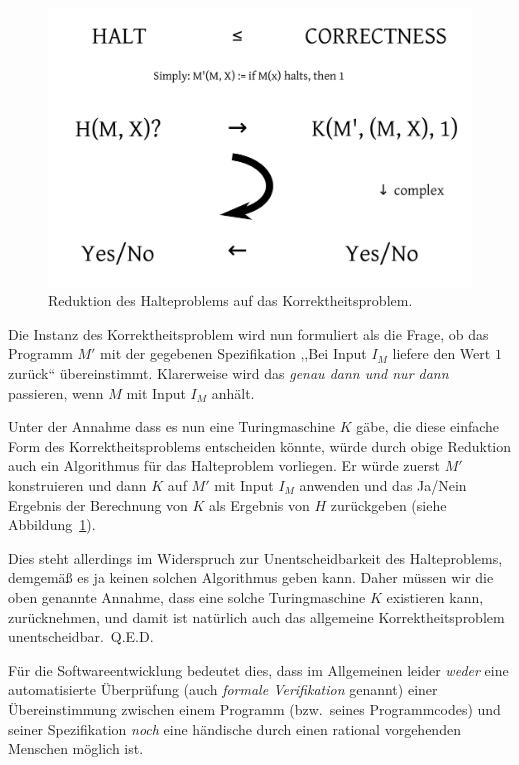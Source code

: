 \begin{figure}[h]
 \begin{center}
  \includegraphics[width=12cm]{img/correctnessproblem}
  \caption{Reduktion des Halteproblems auf das Korrektheitsproblem.}
  \label{fig:correctnessproblem}
 \end{center}
\end{figure}

Die Instanz des Korrektheitsproblem wird nun formuliert als die Frage, ob das Programm $M'$ mit der gegebenen Spezifikation ,,Bei Input $I_M$ liefere den Wert $1$ zurück`` übereinstimmt. Klarerweise wird das \emph{genau dann und nur dann} passieren, wenn $M$ mit Input $I_M$ anhält.

Unter der Annahme dass es nun eine Turingmaschine $K$ gäbe, die diese einfache Form des Korrektheitsproblems entscheiden könnte, würde durch obige Reduktion auch ein Algorithmus für das Halteproblem vorliegen. Er würde zuerst $M'$ konstruieren und dann $K$ auf $M'$ mit Input $I_M$ anwenden und das Ja/Nein Ergebnis der Berechnung von $K$ als Ergebnis von $H$ zurückgeben (siehe Abbildung~\ref{fig:correctnessproblem}).

Dies steht allerdings im Widerspruch zur Unentscheidbarkeit des Halteproblems, demgemäß es ja keinen solchen Algorithmus geben kann. Daher müssen wir die oben genannte Annahme, dass eine solche Turingmaschine $K$ existieren kann, zurücknehmen, und damit ist natürlich auch das allgemeine Korrektheitsproblem unentscheidbar.~Q.E.D.

Für die Softwareentwicklung bedeutet dies, dass im Allgemeinen leider \emph{weder} eine automatisierte Überprüfung (auch \emph{formale Verifikation} genannt) einer Übereinstimmung zwischen einem Programm (bzw.\ seines Programmcodes) und seiner Spezifikation \emph{noch} eine händische durch einen rational vorgehenden Menschen möglich ist.
